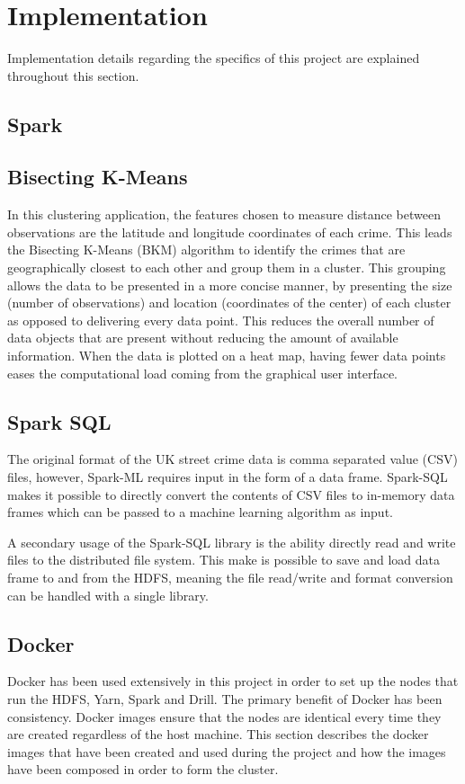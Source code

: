 \documentclass[main.tex]{subfiles}
\begin{document}
\section{Implementation}
\label{implementation}
Implementation details regarding the specifics of this project are explained throughout this section.
\subsection{Spark}

\subsection{Bisecting K-Means}
In this clustering application, the features chosen to measure distance between observations are the latitude and longitude coordinates of each crime. This leads the Bisecting K-Means (BKM) algorithm to identify the crimes that are geographically closest to each other and group them in a cluster. This grouping allows the data to be presented in a more concise manner, by presenting the size (number of observations) and location (coordinates of the center) of each cluster as opposed to delivering every data point. This reduces the overall number of data objects that are present without reducing the amount of available information. When the data is plotted on a heat map, having fewer data points eases the computational load coming from the graphical user interface.

\subsection{Spark SQL}
The original format of the UK street crime data is comma separated value (CSV) files, however, Spark-ML requires input in the form of a data frame. Spark-SQL makes it possible to directly convert the contents of CSV files to in-memory data frames which can be passed to a machine learning algorithm as input.

A secondary usage of the Spark-SQL library is the ability directly read and write files to the distributed file system. This make is possible to save and load data frame to and from the HDFS, meaning the file read/write and format conversion can be handled with a single library. 

\subsection{Docker}
Docker has been used extensively in this project in order to set up the nodes that run the HDFS, Yarn, Spark and Drill. The primary benefit of Docker has been consistency. Docker images ensure that the nodes are identical every time they are created regardless of the host machine. This section describes the docker images that have been created and used during the project and how the images have been composed in order to form the cluster.
\end{document}
